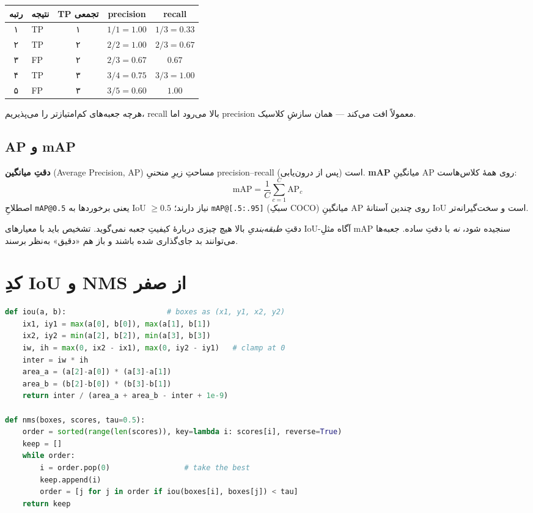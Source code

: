 \documentclass[12pt,a4paper]{article}
\begin{document}
\begin{center}
\begin{tabular}{@{}clccc@{}}
\hline
\textbf{رتبه} & \textbf{نتیجه} & \textbf{TPِ تجمعی} & \textbf{precision} & \textbf{recall} \\
\hline
۱ & TP & ۱ & $1/1=1.00$ & $1/3=0.33$ \\
۲ & TP & ۲ & $2/2=1.00$ & $2/3=0.67$ \\
۳ & FP & ۲ & $2/3=0.67$ & $0.67$ \\
۴ & TP & ۳ & $3/4=0.75$ & $3/3=1.00$ \\
۵ & FP & ۳ & $3/5=0.60$ & $1.00$ \\
\hline
\end{tabular}
\end{center}

هرچه جعبه‌های کم‌امتیازتر را می‌پذیریم، recall بالا می‌رود اما precision معمولاً افت می‌کند — همان سازشِ کلاسیک.

\subsection{AP و mAP}

\begin{riyazi}
\textbf{دقتِ میانگین} (Average Precision, AP) مساحتِ زیرِ منحنیِ precision--recall (پس از درون‌یابی) است. \textbf{mAP} میانگینِ AP روی همهٔ کلاس‌هاست:
\[
\text{mAP}=\frac{1}{C}\sum_{c=1}^{C}\text{AP}_c
\]
اصطلاحِ \texttt{mAP@0.5} یعنی برخوردها به IoU $\ge0.5$ نیاز دارند؛ \texttt{mAP@[.5:.95]} (سبکِ COCO) میانگینِ AP روی چندین آستانهٔ IoU است و سخت‌گیرانه‌تر.
\end{riyazi}

\begin{hoshdar}
دقتِ \emph{طبقه‌بندیِ} بالا هیچ چیزی دربارهٔ کیفیتِ جعبه نمی‌گوید. تشخیص باید با معیارهای IoU-آگاه مثلِ mAP سنجیده شود، \emph{نه} با دقتِ ساده. جعبه‌ها می‌توانند بد جای‌گذاری شده باشند و باز هم «دقیق» به‌نظر برسند.
\end{hoshdar}

\section{کدِ IoU و NMS از صفر}

\begin{ltrcode}
\begin{lstlisting}[language=Python]
def iou(a, b):                       # boxes as (x1, y1, x2, y2)
    ix1, iy1 = max(a[0], b[0]), max(a[1], b[1])
    ix2, iy2 = min(a[2], b[2]), min(a[3], b[3])
    iw, ih = max(0, ix2 - ix1), max(0, iy2 - iy1)   # clamp at 0
    inter = iw * ih
    area_a = (a[2]-a[0]) * (a[3]-a[1])
    area_b = (b[2]-b[0]) * (b[3]-b[1])
    return inter / (area_a + area_b - inter + 1e-9)

def nms(boxes, scores, tau=0.5):
    order = sorted(range(len(scores)), key=lambda i: scores[i], reverse=True)
    keep = []
    while order:
        i = order.pop(0)                 # take the best
        keep.append(i)
        order = [j for j in order if iou(boxes[i], boxes[j]) < tau]
    return keep
\end{lstlisting}
\end{ltrcode}
\end{document}
